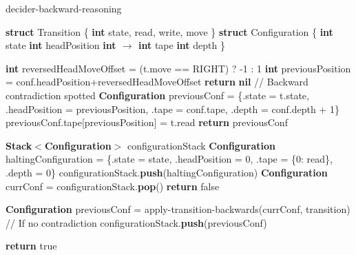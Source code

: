 \begin{algorithm}
  \caption{{\sc decider-backward-reasoning}}\label{alg:backward-reasoning}

  \begin{algorithmic}[1]
    \State \textbf{struct} Transition \{
    \State \tabi\textbf{int} state, read, write, move
    \State \}
    \State \textbf{struct} Configuration \{
    \State \tabi\textbf{int} state
    \State \tabi\textbf{int} headPosition
    \State \tabi\textbf{int $\boldsymbol{\to}$ int} tape
    \State \tabi\textbf{int} depth
    \State \}

    \State

    \State \textbf{int} reversedHeadMoveOffset = (t.move == RIGHT) ? -1 : 1
    \State \textbf{int} previousPosition = conf.headPosition+reversedHeadMoveOffset
    \State \textbf{return} \textbf{nil} // Backward contradiction spotted
    \EndIf
    \State \textbf{Configuration} previousConf = \{.state = t.state, .headPosition = previousPosition, .tape = conf.tape, .depth = conf.depth + 1\}
    \State previousConf.tape[previousPosition] = t.read
    \State \textbf{return} previousConf
    \EndProcedure
    \State

    \State \textbf{Stack$\boldsymbol{<}$Configuration$\boldsymbol{>}$} configurationStack
    \State \textbf{Configuration} haltingConfiguration = \{.state = state, .headPosition = 0, .tape = \{0: read\}, .depth = 0\}
    \State configurationStack.\textbf{push}(haltingConfiguration)
    \EndFor
    \State \textbf{Configuration} currConf = configurationStack.\textbf{pop}()
     \textbf{return} false \EndIf

    \State \textbf{Configuration} previousConf = {\sc apply-transition-backwards}(currConf, transition)
    \State // If no contradiction
    \State configurationStack.\textbf{push}(previousConf)
    \EndIf
    \EndFor
    \EndWhile

    \State \textbf{return} true
    \EndProcedure

  \end{algorithmic}
\end{algorithm}

